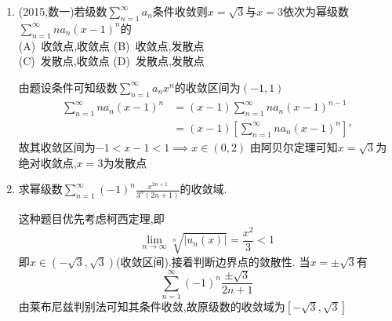 \documentclass[12pt, a4paper, oneside, UTF8]{ctexbook}
\begin{document}
\newpage

\begin{enumerate}[label=\arabic*.,start=6]
    \item (2015,数一)若级数$\displaystyle\sum_{n=1}^{\infty} a_n$条件收敛则$x=\sqrt{3}$与$x=3$依次为幂级数 \\
    $\displaystyle\sum_{n=1}^{\infty} n a_n(x-1)^n$的 \\
    (A)\ 收敛点,收敛点 \qquad (B)\ 收敛点,发散点\\ 
    (C)\ 发散点,收敛点 \qquad (D)\ 发散点,发散点
    
    \begin{solution}
    由题设条件可知级数$\displaystyle\sum_{n=1}^{\infty} a_nx^n$的收敛区间为$(-1,1)$ 
    \begin{align*}
        \sum_{n=1}^{\infty} n a_n(x-1)^n &= (x-1)\sum_{n=1}^{\infty} n a_n(x-1)^{n-1} \\
        &=(x-1)\left[\sum_{n=1}^{\infty} n a_n(x-1)^n\right]' 
    \end{align*}
    故其收敛区间为$-1<x-1<1\implies x\in(0,2)$ 由阿贝尔定理可知$x=\sqrt{3}$为绝对收敛点,$x=3$为发散点  
    \end{solution}
    
    \item 求幂级数$\displaystyle\sum_{n=1}^{\infty}(-1)^n\frac{x^{2n+1}}{3^n(2n+1)}$的收敛域.
    
    \begin{solution}
    这种题目优先考虑柯西定理,即
    $$
    \lim_{n\to\infty}\sqrt[n]{\left|u_n(x)\right|} = \frac{x^2}{3} < 1
    $$
    即$x\in(-\sqrt{3},\sqrt{3})$(收敛区间).接着判断边界点的敛散性. 当$x=\pm\sqrt{3}$有
    $$
    \sum_{n=1}^{\infty}(-1)^n\frac{\pm\sqrt{3}}{2n+1}
    $$
    由莱布尼兹判别法可知其条件收敛,故原级数的收敛域为$\left[-\sqrt{3},\sqrt{3}\right]$
    \end{solution}
\end{enumerate}

\newpage
\end{document}
